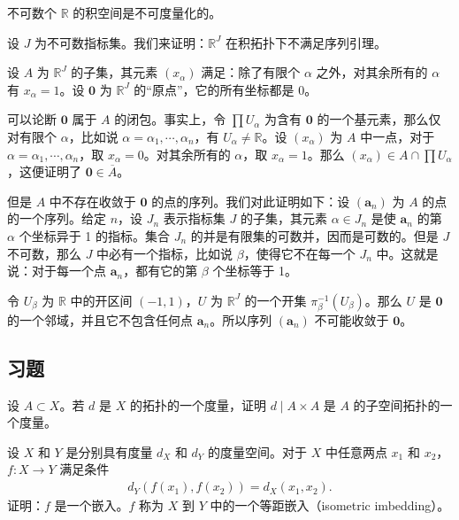\documentclass[../../main.tex]{subfiles}
\begin{document}
\begin{example}\label{example:ch02-不可数积不可度量}
不可数个 $\mathbb{R}$ 的积空间是不可度量化的。

设 $J$ 为不可数指标集。我们来证明：$\mathbb{R}^{J}$ 在积拓扑下不满足序列引理。

设 $A$ 为 $\mathbb{R}^{J}$ 的子集，其元素 $(x_{\alpha})$ 满足：除了有限个 $\alpha$ 之外，对其余所有的 $\alpha$ 有 $x_{\alpha} = 1$。设 $\boldsymbol{0}$ 为 $\mathbb{R}^{J}$ 的“原点”，它的所有坐标都是 0。

可以论断 $\boldsymbol{0}$ 属于 $A$ 的闭包。事实上，令 $\prod U_{\alpha}$ 为含有 $\boldsymbol{0}$ 的一个基元素，那么仅对有限个 $\alpha$，比如说 $\alpha = \alpha_{1}, \cdots, \alpha_{n}$，有 $U_{\alpha} \neq \mathbb{R}$。设 $(x_{\alpha})$ 为 $A$ 中一点，对于 $\alpha = \alpha_{1}, \cdots, \alpha_{n}$，取 $x_{\alpha} = 0$。对其余所有的 $\alpha$，取 $x_{\alpha} = 1$。那么 $(x_{\alpha}) \in A \cap \prod U_{\alpha}$，这便证明了 $\boldsymbol{0} \in \overline{A}$。

但是 $A$ 中不存在收敛于 $\boldsymbol{0}$ 的点的序列。我们对此证明如下：设 $(\boldsymbol{a}_{n})$ 为 $A$ 的点的一个序列。给定 $n$，设 $J_{n}$ 表示指标集 $J$ 的子集，其元素 $\alpha \in J_{n}$ 是使 $\boldsymbol{a}_{n}$ 的第 $\alpha$ 个坐标异于 1 的指标。集合 $J_{n}$ 的并是有限集的可数并，因而是可数的。但是 $J$ 不可数，那么 $J$ 中必有一个指标，比如说 $\beta$，使得它不在每一个 $J_{n}$ 中。这就是说：对于每一个点 $\boldsymbol{a}_{n}$，都有它的第 $\beta$ 个坐标等于 1。

令 $U_{\beta}$ 为 $\mathbb{R}$ 中的开区间 $(-1, 1)$，$U$ 为 $\mathbb{R}^{J}$ 的一个开集 $\pi_{\beta}^{-1}(U_{\beta})$。那么 $U$ 是 $\boldsymbol{0}$ 的一个邻域，并且它不包含任何点 $\boldsymbol{a}_{n}$。所以序列 $(\boldsymbol{a}_{n})$ 不可能收敛于 $\boldsymbol{0}$。
\end{example}

\subsection*{习题}

\begin{exercise}\label{exercise:ch02-度量拓扑续-1}
设 $A \subset X$。若 $d$ 是 $X$ 的拓扑的一个度量，证明 $d \mid A \times A$ 是 $A$ 的子空间拓扑的一个度量。
\end{exercise}

\begin{exercise}\label{exercise:ch02-度量拓扑续-2}
设 $X$ 和 $Y$ 是分别具有度量 $d_{X}$ 和 $d_{Y}$ 的度量空间。对于 $X$ 中任意两点 $x_{1}$ 和 $x_{2}$，$f: X \rightarrow Y$ 满足条件
\begin{align*}
d_{Y}(f(x_{1}), f(x_{2})) = d_{X}(x_{1}, x_{2}).
\end{align*}
证明：$f$ 是一个嵌入。$f$ 称为 $X$ 到 $Y$ 中的一个等距嵌入（isometric imbedding）。
\end{exercise}
\end{document}

